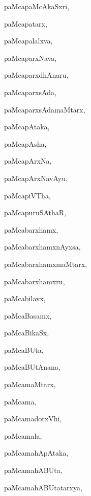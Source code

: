 \begin{multicols}{3}
{\noindent
{paMcapaMcAkaSxri}, \pageref{paMcapaMcAkaSxri}

\noindent
{paMcapatarx}, \pageref{paMcapatarx}

\noindent
{paMcapalalxva}, \pageref{paMcapalalxva}

\noindent
{paMcaparxNava}, \pageref{paMcaparxNava}

\noindent
{paMcaparxdhAnaru}, \pageref{paMcaparxdhAnaru}

\noindent
{paMcaparxsAda}, \pageref{paMcaparxsAda}

\noindent
{paMcaparxsAdamaMtarx}, \pageref{paMcaparxsAdamaMtarx}

\noindent
{paMcapAtaka}, \pageref{paMcapAtaka}

\noindent
{paMcapAsha}, \pageref{paMcapAsha}

\noindent
{paMcapArxNa}, \pageref{paMcapArxNa}

\noindent
{paMcapArxNavAyu}, \pageref{paMcapArxNavAyu}

\noindent
{paMcapiVTha}, \pageref{paMcapiVTha}

\noindent
{paMcapuruSAthaR}, \pageref{paMcapuruSAthaR}

\noindent
{paMcabarxhamx}, \pageref{paMcabarxhamx}

\noindent
{paMcabarxhamxnAyxsa}, \pageref{paMcabarxhamxnAyxsa}

\noindent
{paMcabarxhamxmaMtarx}, \pageref{paMcabarxhamxmaMtarx}

\noindent
{paMcabarxhamxru}, \pageref{paMcabarxhamxru}

\noindent
{paMcabilavx}, \pageref{paMcabilavx}

\noindent
{paMcaBasamx}, \pageref{paMcaBasamx}

\noindent
{paMcaBikaSx}, \pageref{paMcaBikaSx}

\noindent
{paMcaBUta}, \pageref{paMcaBUta2}

\noindent
{paMcaBUtAnana}, \pageref{paMcaBUtAnana}

\noindent
{paMcamaMtarx}, \pageref{paMcamaMtarx}

\noindent
{paMcama}, \pageref{paMcama}

\noindent
{paMcamadorxVhi}, \pageref{paMcamadorxVhi}

\noindent
{paMcamala}, \pageref{paMcamala}

\noindent
{paMcamahApAtaka}, \pageref{paMcamahApAtaka}

\noindent
{paMcamahABUta}, \pageref{paMcamahABUta}

\noindent
{paMcamahABUtatarxya}, \pageref{paMcamahABUtatarxya}

}
\end{multicols}
